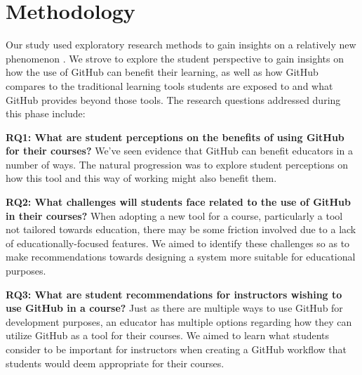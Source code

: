 \section{Methodology}
Our study used exploratory research methods to gain insights on a relatively new phenomenon \cite{easterbrook2008selecting}. We strove to explore the student perspective to gain insights on how the use of GitHub can benefit their learning, as well as how GitHub compares to the traditional learning tools students are exposed to and what GitHub provides beyond those tools. The research questions addressed during this phase include:

\textbf{RQ1: What are student perceptions on the benefits of using GitHub for their courses?} We've seen evidence that GitHub can benefit educators in a number of ways. The natural progression was to explore student perceptions on how this tool and this way of working might also benefit them.

\textbf{RQ2: What challenges will students face related to the use of GitHub in their courses?} When adopting a new tool for a course, particularly a tool not tailored towards education, there may be some friction involved due to a lack of educationally-focused features. We aimed to identify these challenges so as to make recommendations towards designing a system more suitable for educational purposes.

\textbf{RQ3: What are student recommendations for instructors wishing to use GitHub in a course?} Just as there are multiple ways to use GitHub for development purposes, an educator has multiple options regarding how they can utilize GitHub as a tool for their courses. We aimed to learn what students consider to be important for instructors when creating a GitHub workflow that students would deem appropriate for their courses.



